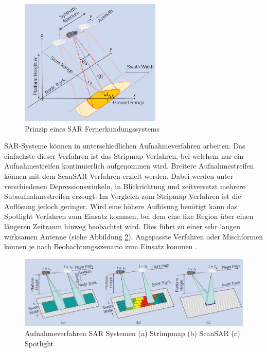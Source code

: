 \begin{figure}[H]
    \centering
    \includegraphics[width=0.6\textwidth]{Bilder/SAR_Prinzip.png}
    \caption{Prinzip eines SAR Fernerkundungssystems \cite{tutorial_on_sar}}
    \label{sar_prinzip}
\end{figure}

SAR-Systeme können in unterschiedlichen Aufnahmeverfahren arbeiten. Das einfachste dieser Verfahren ist das Stripmap Verfahren, bei welchem nur ein Aufnahmestreifen
kontinuierlich aufgenommen wird. Breitere Aufnahmestreifen können mit dem ScanSAR Verfahren erzielt werden. Dabei werden unter verschiedenen Depressionswinkeln, 
in Blickrichtung und zeitversetzt mehrere Subaufnahmestreifen erzeugt. Im Vergleich zum Stripmap Verfahren ist die Auflösung jedoch geringer. 
Wird eine höhere Auflösung benötigt kann das Spotlight Verfahren zum Einsatz kommen, bei dem eine fixe Region über einen längeren Zeitraum hinweg beobachtet 
wird. Dies führt zu einer sehr langen wirksamen Antenne (siehe Abbildung \ref{sar_scan_modi}). Angepasste Verfahren oder Mischformen können je nach 
Beobachtungsszenario zum Einsatz kommen \cite{tutorial_on_sar}. 

\begin{figure}[H]
    \centering
    \includegraphics[width=\textwidth]{Bilder/SAR_Modi.png}
    \caption{Aufnahmeverfahren SAR Systemen (a) Strimpmap (b) ScanSAR (c) Spotlight \cite{tutorial_on_sar}}
    \label{sar_scan_modi}
\end{figure}

